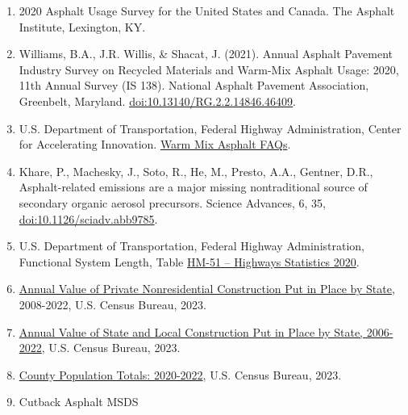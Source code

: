 \documentclass[
  11pt,
  oneside]{book}
\providecommand{\tightlist}{%
  \setlength{\itemsep}{0pt}\setlength{\parskip}{0pt}}
\begin{document}
\begin{enumerate}
\def\labelenumi{\arabic{enumi}.}
\tightlist
\item
  2020 Asphalt Usage Survey for the United States and Canada. The Asphalt Institute, Lexington, KY.
\item
  Williams, B.A., J.R. Willis, \& Shacat, J. (2021). Annual Asphalt Pavement Industry Survey on Recycled Materials and Warm-Mix Asphalt Usage: 2020, 11th Annual Survey (IS 138). National Asphalt Pavement Association, Greenbelt, Maryland. \url{doi:10.13140/RG.2.2.14846.46409}.
\item
  U.S. Department of Transportation, Federal Highway Administration, Center for Accelerating Innovation. \href{https://www.fhwa.dot.gov/innovation/everydaycounts/edc-1/wma-faqs.cfm\#hot}{Warm Mix Asphalt FAQs}.
\item
  Khare, P., Machesky, J., Soto, R., He, M., Presto, A.A., Gentner, D.R., Asphalt-related emissions are a major missing nontraditional source of secondary organic aerosol precursors. Science Advances, 6, 35, \url{doi:10.1126/sciadv.abb9785}.
\item
  U.S. Department of Transportation, Federal Highway Administration, Functional System Length, Table \href{https://www.fhwa.dot.gov/policyinformation/statistics/2020/hm51.cfm}{HM-51 -- Highways Statistics 2020}.
\item
  \href{https://www.census.gov/construction/c30/xlsx/nrstate.xlsx}{Annual Value of Private Nonresidential Construction Put in Place by State}, 2008-2022, U.S. Census Bureau, 2023.
\item
  \href{https://www.census.gov/construction/c30/xlsx/slstate.xlsx}{Annual Value of State and Local Construction Put in Place by State, 2006-2022}, U.S. Census Bureau, 2023.
\item
  \href{https://www.census.gov/programs-surveys/popest/data/tables.html}{County Population Totals: 2020-2022}, U.S. Census Bureau, 2023.
\item
  Cutback Asphalt MSDS
\end{enumerate}

\begin{table}[H]
\centering
{}
\end{table}
\end{document}
